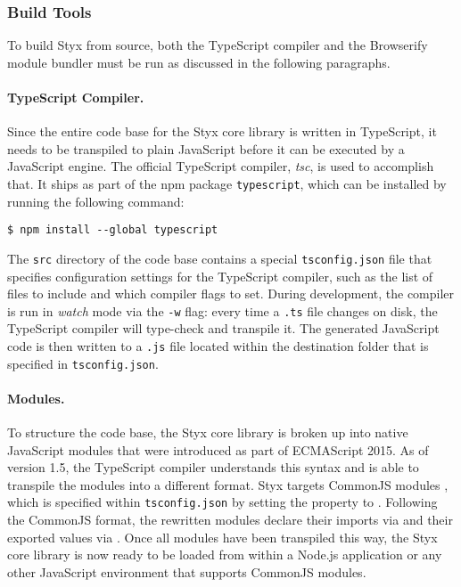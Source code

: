 \subsubsection{Build Tools}
\label{sec:build-tools}

To build Styx from source, both the TypeScript compiler and the Browserify module bundler \cite{browserify} must be run as discussed in the following paragraphs.

\paragraph{TypeScript Compiler.}
Since the entire code base for the Styx core library is written in TypeScript, it needs to be transpiled to plain JavaScript before it can be executed by a JavaScript engine. The official TypeScript compiler, \textit{tsc}, is used to accomplish that. It ships as part of the npm \cite{npm} package \texttt{typescript}, which can be installed by running the following command:

\begin{verbatim}
$ npm install --global typescript
\end{verbatim}

The \texttt{src} directory of the code base contains a special \texttt{tsconfig.json} file that specifies configuration settings for the TypeScript compiler, such as the list of files to include and which compiler flags to set. During development, the compiler is run in \textit{watch} mode via the \texttt{-w} flag: every time a \texttt{.ts} file changes on disk, the TypeScript compiler will type-check and transpile it. The generated JavaScript code is then written to a \texttt{.js} file located within the destination folder that is specified in \texttt{tsconfig.json}.

\paragraph{Modules.}
To structure the code base, the Styx core library is broken up into native JavaScript modules that were introduced as part of ECMAScript 2015. As of version 1.5, the TypeScript compiler understands this syntax and is able to transpile the modules into a different format. Styx targets CommonJS modules \cite{commonjs-modules}, which is specified within \texttt{tsconfig.json} by setting the  property to . Following the CommonJS format, the rewritten modules declare their imports via  and their exported values via . Once all modules have been transpiled this way, the Styx core library is now ready to be loaded from within a Node.js application or any other JavaScript environment that supports CommonJS modules.

